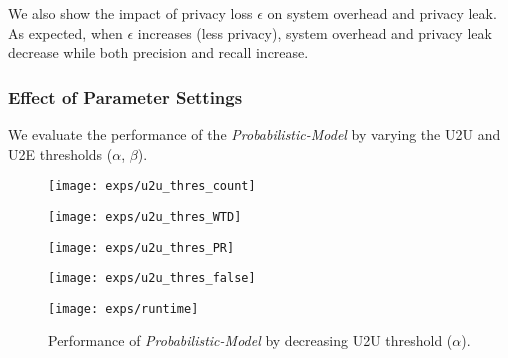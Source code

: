 \documentclass{USC-Thesis}
\numberwithin{equation}{chapter}
\begin{document}
We also show the impact of privacy loss $\epsilon$ on system overhead and privacy leak. As expected, when $\epsilon$ increases (less privacy), system overhead and privacy leak decrease while both precision and recall increase.

\subsubsection{Effect of Parameter Settings}
\label{label:thresholds}
We evaluate the performance of  the  \emph{Probabilistic-Model} by varying the U2U and U2E thresholds ($\alpha$, $\beta$).

\begin{figure*}[!ht]
	\begin{minipage}[b]{0.195\linewidth}
		\centering
		\texttt{[image: exps/u2u\_thres\_count]}
		\label{fig:u2u_thres_count}
	\end{minipage}
	\begin{minipage}[b]{0.195\linewidth}
		\centering
		\texttt{[image: exps/u2u\_thres\_WTD]}
		\label{fig:u2u_thres_WTD}
	\end{minipage}
	\begin{minipage}[b]{0.195\linewidth}
		\centering
		\texttt{[image: exps/u2u\_thres\_PR]}
		\label{fig:u2u_thres_PR}
	\end{minipage}
	\begin{minipage}[b]{0.195\linewidth}
		\centering
		\texttt{[image: exps/u2u\_thres\_false]}
		\label{fig:u2u_thres_false}
	\end{minipage}
	\begin{minipage}[b]{0.195\linewidth}
		\centering
		\texttt{[image: exps/runtime]}
		\label{fig:runtime}
	\end{minipage}
	\caption{Performance of \emph{Probabilistic-Model} by decreasing U2U threshold ($\alpha$).}
\label{fig:vary_alpha}
\end{figure*}
\end{document}

